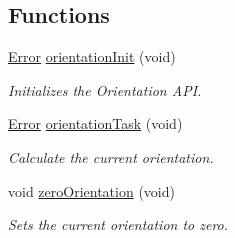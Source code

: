 \subsection*{Functions}
\begin{DoxyCompactItemize}
\item 
\hyperlink{group__error_ga2c3e4bb40f36b262a5214e2da2bca9c5}{Error} \hyperlink{group__orientation_gaa5724492d0f54b41a8984cdde51d59df}{orientation\-Init} (void)
\begin{DoxyCompactList}\small\item\em Initializes the Orientation A\-P\-I. \end{DoxyCompactList}\item 
\hyperlink{group__error_ga2c3e4bb40f36b262a5214e2da2bca9c5}{Error} \hyperlink{group__orientation_ga966edaeb4790aecd79b3c49ede459e56}{orientation\-Task} (void)
\begin{DoxyCompactList}\small\item\em Calculate the current orientation. \end{DoxyCompactList}\item 
void \hyperlink{group__orientation_ga0fab95dd407145abad293f7c91460eee}{zero\-Orientation} (void)
\begin{DoxyCompactList}\small\item\em Sets the current orientation to zero. \end{DoxyCompactList}\end{DoxyCompactItemize}
